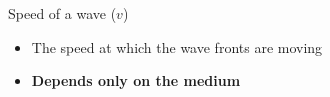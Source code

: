 Speed of a wave ($v$)
\begin{itemize}
\item The speed at which the wave fronts are moving
\item\textbf{Depends only on the medium}
\end{itemize}


%
%
%
%
%  
%    
%  
%
%
%
%
